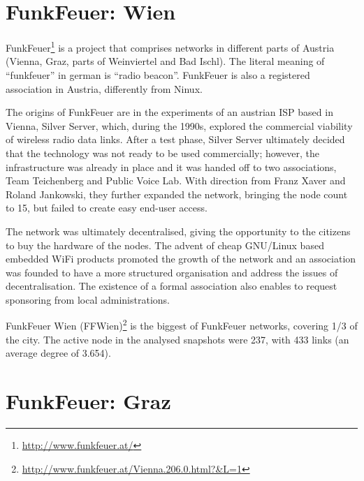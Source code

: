 \documentclass[oneside,openany]{memoir}
\begin{document}
\section{FunkFeuer: Wien}\label{funkfeuer-wien}

FunkFeuer\footnote{\url{http://www.funkfeuer.at/}} is a project that
comprises networks in different parts of Austria (Vienna, Graz, parts of
Weinviertel and Bad Ischl). The literal meaning of ``funkfeuer'' in
german is ``radio beacon''. FunkFeuer is also a registered association
in Austria, differently from Ninux.

The origins of FunkFeuer are in the experiments of an austrian ISP based
in Vienna, Silver Server, which, during the 1990s, explored the
commercial viability of wireless radio data links. After a test phase,
Silver Server ultimately decided that the technology was not ready to be
used commercially; however, the infrastructure was already in place and
it was handed off to two associations, Team Teichenberg and Public Voice
Lab. With direction from Franz Xaver and Roland Jankowski, they further
expanded the network, bringing the node count to 15, but failed to
create easy end-user access.

The network was ultimately decentralised, giving the opportunity to the
citizens to buy the hardware of the nodes. The advent of cheap GNU/Linux
based embedded WiFi products promoted the growth of the network and an
association was founded to have a more structured organisation and
address the issues of decentralisation. The existence of a formal
association also enables to request sponsoring from local
administrations.

FunkFeuer Wien (FFWien)\footnote{\url{http://www.funkfeuer.at/Vienna.206.0.html?\&L=1}}
is the biggest of FunkFeuer networks, covering 1/3 of the city. The
active node in the analysed snapshots were 237, with 433 links (an
average degree of 3.654).

\section{FunkFeuer: Graz}\label{funkfeuer-graz}
\end{document}
